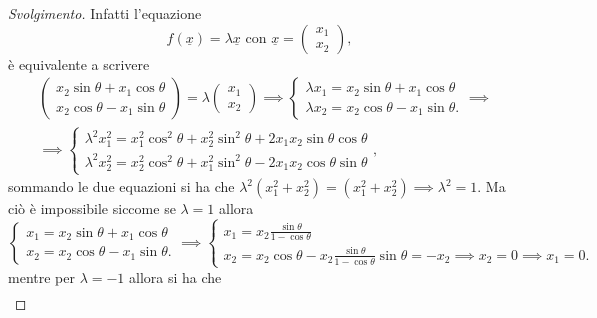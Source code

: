 \begin{proof}[Svolgimento]
    Infatti l'equazione
    $$
        f(\underline{x}) = \lambda \underline{x} \text{ con } \underline{x} = \begin{pmatrix}
            x_1 \\
            x_2
        \end{pmatrix},
    $$
    è equivalente a scrivere 
    \begin{align}
        &\begin{pmatrix}
            x_2 \sin{\theta} + x_1 \cos{\theta} \\
            x_2 \cos{\theta} - x_1 \sin{\theta}
        \end{pmatrix} = \lambda \begin{pmatrix}
            x_1 \\
            x_2
        \end{pmatrix} \implies \begin{cases}
            \lambda x_1 = x_2 \sin{\theta} + x_1 \cos{\theta} \\
            \lambda x_2 = x_2 \cos{\theta} - x_1 \sin{\theta}. 
        \end{cases} \implies \\
        &\implies \begin{cases}
            \lambda^2 x_1^2 = x_1^2 \cos^2{\theta} + x_2^2 \sin^2{\theta} + 2 x_1 x_2 \sin{\theta} \cos{\theta} \\
            \lambda^2 x_2^2 = x_2^2 \cos^2{\theta} + x_1^2 \sin^2{\theta} - 2 x_1 x_2 \cos{\theta} \sin{\theta}
        \end{cases},
    \end{align}
    sommando le due equazioni si ha che $\lambda^2 (x_1^2 + x_2^2) = (x_1^2 + x_2^2) \implies \lambda^2 = 1$. Ma ciò è impossibile siccome
    se $\lambda = 1$ allora
    $$
        \begin{cases}
            x_1 = x_2 \sin{\theta} + x_1 \cos{\theta} \\
            x_2 = x_2 \cos{\theta} - x_1 \sin{\theta}. 
        \end{cases} \implies \begin{cases}
            x_1 = x_2 \frac{\sin{\theta}}{1-\cos{\theta}} \\
            x_2 = x_2 \cos{\theta} - x_2 \frac{\sin{\theta}}{1-\cos{\theta}} \sin{\theta} = -x_2 \implies x_2 = 0 \implies x_1 = 0.
        \end{cases}
    $$
    mentre per $\lambda = -1$ allora si ha che
    \begin{align}

\end{align}
\end{proof}
